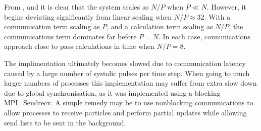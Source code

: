 \vZeroTimeExplanation
{}
{}
{}
{\pairoperation{}}
{\systolicloop{}}

%
From
,
 and
it is clear that the system scales as $N/P$ when $P \ll{} N$.
%
However, it begins deviating significantly from linear scaling
when $N/P \approx{} 32$.
%
With a communication term scaling as $P$, and a calculation term
scaling as $N/P$, the communications term dominates far before $P = N$.
%
In each case, connunications approach close to pass calculations in time
when $N/P = 8$.

The implimentation ultimately becomes slowed due to
communication latency caused by a large number
of systolic pulses per time step.
%
When going to much larger numbers of processes
this implementation may suffer from extra slow down due to
global synchronisation, as it was implemented using a blocking
MPI\_Sendrecv.
%
A simple remedy may be to use nonblocking communications to allow
processes to receive particles and perform partial updates while
allowing send lists to be sent in the background.
